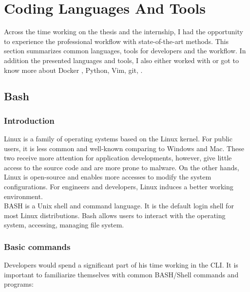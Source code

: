 \chapter{Coding Languages And Tools}

Across the time working on the thesis and the internship, I had the opportunity to experience the professional workflow with state-of-the-art methods. This section summarizes common languages, tools for developers and the workflow. In addition the presented languages and tools, I also either worked with or got to know more about Docker \cite{merkel2014docker}, Python, Vim, git, \etc.

\section{Bash}

\subsection{Introduction}

Linux is a family of operating systems based on the Linux kernel. For public users, it is less common and well-known comparing to Windows and Mac. These two receive more attention for application developments, however, give little access to the source code and are more prone to malware. On the other hands, Linux is open-source and enables more accesses to modify the system configurations. For engineers and developers, Linux induces a better working environment.\\

\ac{BASH} is a Unix shell and command language. It is the default login shell for most Linux distributions. Bash allows users to interact with the operating system, accessing, managing file system.

\subsection{Basic commands}

Developers would spend a significant part of his time working in the \ac{CLI}. It is important to familiarize themselves with common \ac{BASH}/Shell commands and programs:

